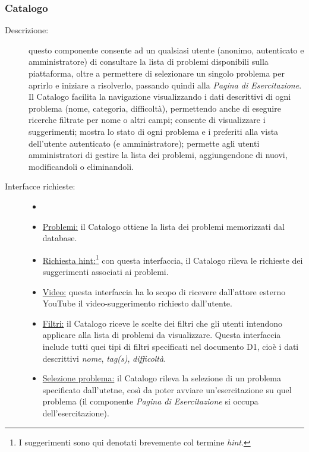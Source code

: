 \documentclass[11pt, a4paper]{article}
\theoremstyle{definition} %
\begin{document}
\subsubsection{Catalogo}
\begin{description}
    \item[Descrizione:] questo componente consente ad un qualsiasi utente
    (anonimo, autenticato e amministratore) di consultare la lista di problemi
    disponibili sulla piattaforma, oltre a permettere di selezionare un singolo
    problema per aprirlo e iniziare a risolverlo, passando quindi alla \textit{Pagina di
    Esercitazione}.
    Il Catalogo facilita la navigazione visualizzando i dati descrittivi di ogni
    problema (nome, categoria, difficoltà), permettendo anche di eseguire ricerche
    filtrate per nome o altri campi; consente di visualizzare i suggerimenti;
    mostra lo stato di ogni problema e i
    preferiti alla vista dell'utente autenticato (e amministratore); permette
    agli utenti amministratori di gestire la lista dei problemi, aggiungendone di
    nuovi, modificandoli o eliminandoli.

    \item[Interfacce richieste:]
    \begin{itemize}
        \item[]

        \item \underline{Problemi:} il Catalogo ottiene la lista dei problemi
        memorizzati dal database.

        \item \underline{Richiesta hint:}\footnote{I suggerimenti sono
        qui denotati brevemente col termine \textit{hint}.}
        con questa interfaccia, il Catalogo rileva le richieste dei
        suggerimenti associati ai problemi.

        \item \underline{Video:} questa interfaccia ha lo scopo di
        ricevere dall'attore esterno YouTube il video-suggerimento
        richiesto dall'utente.

        \item \underline{Filtri:} il Catalogo riceve le scelte dei filtri
        che gli utenti intendono applicare alla lista di problemi da
        visualizzare. Questa interfaccia include tutti quei tipi di
        filtri specificati nel documento D1, cioè i dati descrittivi
        \textit{nome}, \textit{tag(s)}, \textit{difficoltà}.

        \item \underline{Selezione problema:} il Catalogo rileva la
        selezione di un problema specificato dall'utetne, così da
        poter avviare un'esercitazione su quel problema (il componente
        \textit{Pagina di Esercitazione} si occupa dell'esercitazione).


\end{itemize}
\end{description}
\end{document}
